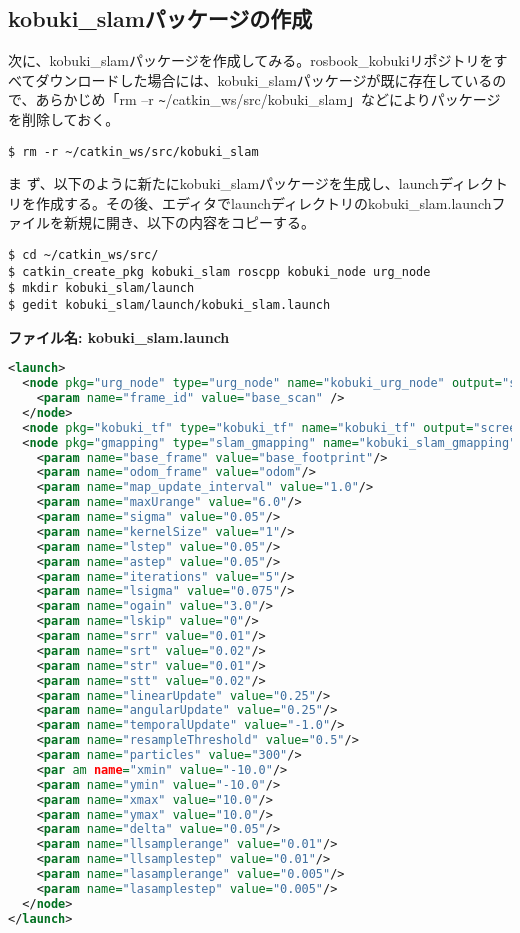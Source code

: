 \subsection{kobuki\_slamパッケージの作成}

次に、kobuki\_slamパッケージを作成してみる。rosbook\_kobukiリポジトリをすべてダウンロードした場合には、kobuki\_slamパッケージが既に存在しているので、あらかじめ「rm –r \verb|~|/catkin\_ws/src/kobuki\_slam」などによりパッケージを削除しておく。

\begin{lstlisting}[language=ROS]
$ rm -r ~/catkin_ws/src/kobuki_slam
\end{lstlisting}

ま  ず、以下のように新たにkobuki\_slamパッケージを生成し、launchディレクトリを作成する。その後、エディタでlaunchディレクトリのkobuki\_slam.launchファイルを新規に開き、以下の内容をコピーする。

\begin{lstlisting}[language=ROS]
$ cd ~/catkin_ws/src/
$ catkin_create_pkg kobuki_slam roscpp kobuki_node urg_node
$ mkdir kobuki_slam/launch
$ gedit kobuki_slam/launch/kobuki_slam.launch
\end{lstlisting}

\textbf{ファイル名: kobuki\_slam.launch}
\begin{lstlisting}[language=XML]
<launch>
  <node pkg="urg_node" type="urg_node" name="kobuki_urg_node" output="screen">
    <param name="frame_id" value="base_scan" />
  </node>
  <node pkg="kobuki_tf" type="kobuki_tf" name="kobuki_tf" output="screen"></node>
  <node pkg="gmapping" type="slam_gmapping" name="kobuki_slam_gmapping" output="screen">
    <param name="base_frame" value="base_footprint"/>
    <param name="odom_frame" value="odom"/>
    <param name="map_update_interval" value="1.0"/>
    <param name="maxUrange" value="6.0"/>
    <param name="sigma" value="0.05"/>
    <param name="kernelSize" value="1"/>
    <param name="lstep" value="0.05"/>
    <param name="astep" value="0.05"/>
    <param name="iterations" value="5"/>
    <param name="lsigma" value="0.075"/>
    <param name="ogain" value="3.0"/>
    <param name="lskip" value="0"/>
    <param name="srr" value="0.01"/>
    <param name="srt" value="0.02"/>
    <param name="str" value="0.01"/>
    <param name="stt" value="0.02"/>
    <param name="linearUpdate" value="0.25"/>
    <param name="angularUpdate" value="0.25"/>
    <param name="temporalUpdate" value="-1.0"/>
    <param name="resampleThreshold" value="0.5"/>
    <param name="particles" value="300"/>
    <par am name="xmin" value="-10.0"/>
    <param name="ymin" value="-10.0"/>
    <param name="xmax" value="10.0"/>
    <param name="ymax" value="10.0"/>
    <param name="delta" value="0.05"/>
    <param name="llsamplerange" value="0.01"/>
    <param name="llsamplestep" value="0.01"/>
    <param name="lasamplerange" value="0.005"/>
    <param name="lasamplestep" value="0.005"/>
  </node>
</launch>
\end{lstlisting}


